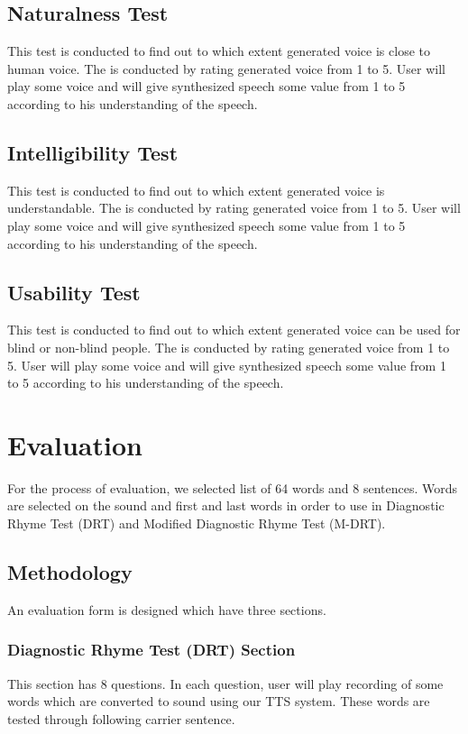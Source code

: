 \subsection{Naturalness Test}
This test is conducted to find out to which extent generated voice is close to human voice. The is conducted by rating generated voice from 1 to 5. User will play some voice and will give synthesized speech some value from 1 to 5 according to his understanding of the speech.

\subsection{Intelligibility Test}
This test is conducted to find out to which extent generated voice is understandable. The is conducted by rating generated voice from 1 to 5. User will play some voice and will give synthesized speech some value from 1 to 5 according to his understanding of the speech.

\subsection{Usability Test}
This test is conducted to find out to which extent generated voice can be used for blind or non-blind people. The is conducted by rating generated voice from 1 to 5. User will play some voice and will give synthesized speech some value from 1 to 5 according to his understanding of the speech.


\section{Evaluation}
For the process of evaluation, we selected list of 64 words and 8 sentences. Words are selected on the sound and first and last words in order to use in Diagnostic Rhyme Test (DRT) and Modified Diagnostic Rhyme Test (M-DRT).

\subsection{Methodology}
An evaluation form is designed which have three sections. 


\subsubsection{Diagnostic Rhyme Test (DRT) Section}

This section has 8 questions. In each question, user will play recording of some words which are converted to sound using our TTS system. These words are tested through following carrier sentence.

